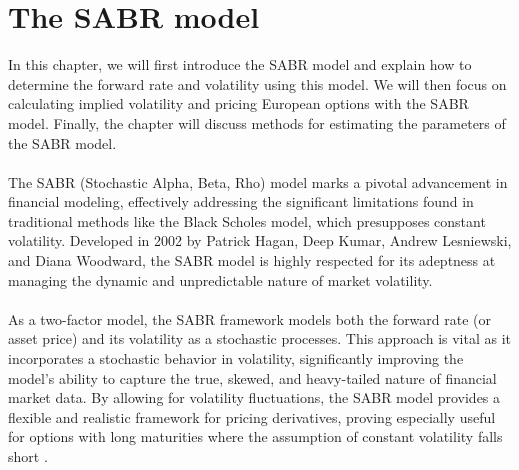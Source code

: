 \section{ The SABR model} \label{SABR_model}
In this chapter, we will first introduce the SABR model
 and explain how to determine the forward rate and 
 volatility using this model. We will then focus on 
 calculating implied volatility and pricing European 
 options with the SABR model. Finally, the chapter 
 will discuss methods for estimating the parameters 
 of the SABR model.
\\\\
The SABR (Stochastic Alpha, Beta, Rho) model marks a pivotal advancement 
in financial modeling, effectively addressing the significant limitations 
found in traditional methods like the Black Scholes model, which presupposes 
constant volatility. Developed in 2002 by Patrick Hagan, Deep Kumar, 
Andrew Lesniewski, and Diana Woodward, the SABR model is highly respected for 
its adeptness at managing the dynamic and unpredictable nature of market 
volatility.
\\\\
As a two-factor model, the SABR framework models both the forward rate 
(or asset price) and its volatility as a stochastic processes. This approach 
is vital as it incorporates a stochastic behavior in volatility, significantly 
improving the model's ability to capture the true, skewed, and heavy-tailed 
nature of financial market data. By allowing for volatility fluctuations, 
the SABR model provides a flexible and realistic framework for pricing 
derivatives, proving especially useful for options with long maturities where 
the assumption of constant volatility falls short \cite{Smile}.
